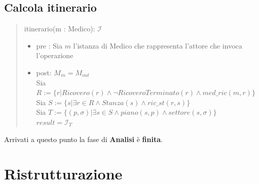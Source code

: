 \documentclass[12pt, letterpaper]{article}
\begin{document}
\subsection{Calcola itinerario}
\begin{quote}
    itinerario(m : Medico): $\mathcal{I}$
    \begin{itemize}
        \item pre : Sia $m$ l'istanza di Medico che rappresenta l'attore che invoca l'operazione
        \item post: $M_{in} = M_{out}$\\
        Sia $R := \{ r | Ricovero(r) \land \lnot RicoveroTerminato(r)\land  med\_ric(m,r)\}$\\
        Sia $S := \{ s | \exists r\in R \land Stanza(s) \land ric\_st(r,s)\}$\\
        Sia $T := \{(p,\sigma) | \exists s\in S \land piano(s,p) \land settore(s,\sigma)\}$\\
        $result = \mathcal{I}_T$
    \end{itemize}
\end{quote}
\newpage

Arrivati a questo punto la fase di \textbf{Analisi} è \textbf{finita}.
\section{Ristrutturazione}
\end{document}
